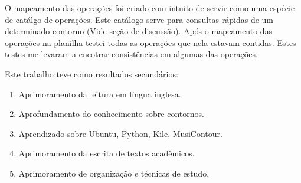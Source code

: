 \documentclass[11pt]{article}
\begin{document}

O mapeamento das operações foi criado com intuito de servir como uma
espécie de catálgo de operações. Este catálogo serve para consultas
rápidas de um determinado contorno (Vide seção de discussão).
Após o mapeamento das operações na planilha testei todas as operações
que nela estavam contidas. Estes testes me levaram a encotrar
consistências em algumas das operações.

Este trabalho teve como resultados secundários:

\begin{enumerate}
\item Aprimoramento da leitura em língua inglesa.
\item Aprofundamento do conhecimento sobre contornos.
\item Aprendizado sobre Ubuntu, Python, Kile, MusiContour.
\item Aprimoramento da escrita de textos acadêmicos.
\item Aprimoramento de organização e técnicas de estudo.
\end{enumerate}

\label{sec:discussao}

\end{document}
